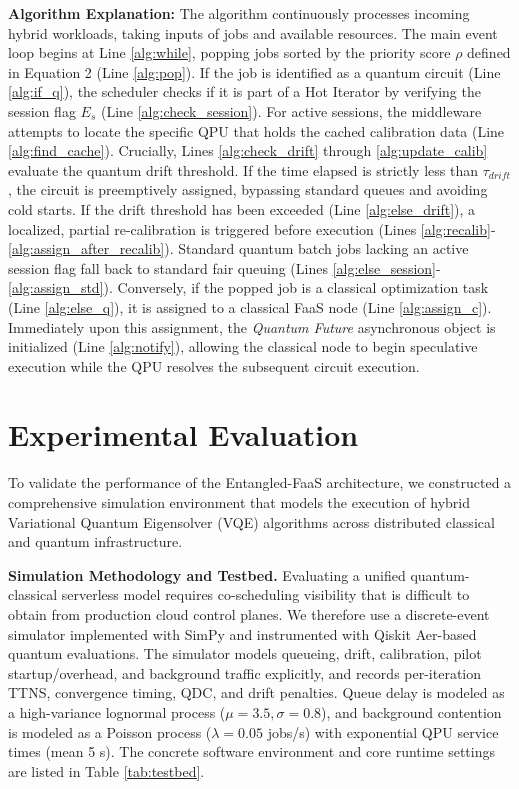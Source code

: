 \documentclass[conference]{IEEEtran}
\begin{document}
\textbf{Algorithm Explanation:} 
The algorithm continuously processes incoming hybrid workloads, taking inputs of jobs and available resources. The main event loop begins at Line \ref{alg:while}, popping jobs sorted by the priority score $\rho$ defined in Equation 2 (Line \ref{alg:pop}). 
If the job is identified as a quantum circuit (Line \ref{alg:if_q}), the scheduler checks if it is part of a Hot Iterator by verifying the session flag $E_s$ (Line \ref{alg:check_session}). For active sessions, the middleware attempts to locate the specific QPU that holds the cached calibration data (Line \ref{alg:find_cache}). Crucially, Lines \ref{alg:check_drift} through \ref{alg:update_calib} evaluate the quantum drift threshold. If the time elapsed is strictly less than $\tau_{drift}$, the circuit is preemptively assigned, bypassing standard queues and avoiding cold starts. If the drift threshold has been exceeded (Line \ref{alg:else_drift}), a localized, partial re-calibration is triggered before execution (Lines \ref{alg:recalib}-\ref{alg:assign_after_recalib}).
Standard quantum batch jobs lacking an active session flag fall back to standard fair queuing (Lines \ref{alg:else_session}-\ref{alg:assign_std}). Conversely, if the popped job is a classical optimization task (Line \ref{alg:else_q}), it is assigned to a classical FaaS node (Line \ref{alg:assign_c}). Immediately upon this assignment, the \textit{Quantum Future} asynchronous object is initialized (Line \ref{alg:notify}), allowing the classical node to begin speculative execution while the QPU resolves the subsequent circuit execution.

\section{Experimental Evaluation}
\label{sec:evaluation}

To validate the performance of the Entangled-FaaS architecture, we constructed a comprehensive simulation environment that models the execution of hybrid Variational Quantum Eigensolver (VQE) algorithms across distributed classical and quantum infrastructure.

\textbf{Simulation Methodology and Testbed.}
Evaluating a unified quantum-classical serverless model requires co-scheduling visibility that is difficult to obtain from production cloud control planes. We therefore use a discrete-event simulator implemented with SimPy and instrumented with Qiskit Aer-based quantum evaluations. The simulator models queueing, drift, calibration, pilot startup/overhead, and background traffic explicitly, and records per-iteration TTNS, convergence timing, QDC, and drift penalties. Queue delay is modeled as a high-variance lognormal process ($\mu=3.5,\sigma=0.8$), and background contention is modeled as a Poisson process ($\lambda=0.05$ jobs/s) with exponential QPU service times (mean 5 s). The concrete software environment and core runtime settings are listed in Table \ref{tab:testbed}.
\end{document}
